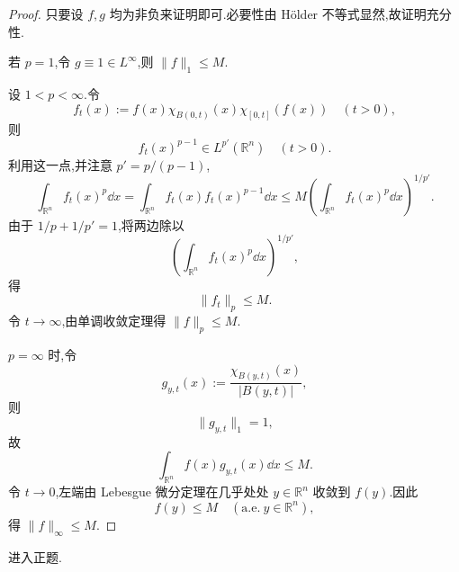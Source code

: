 \begin{proof}
只要设 $f, g$ 均为非负来证明即可.必要性由 Hölder 不等式显然,故证明充分性.

若 $p = 1$,令 $g \equiv 1 \in L^{\infty}$,则 $\|f\|_{1} \leq M$.

设 $1 < p < \infty$.令
\begin{equation*}
f_{t}(x) := f(x)\chi_{B(0,t)}(x)\chi_{[0,t]}(f(x)) \quad (t > 0),
\end{equation*}
则
\begin{equation*}
f_{t}(x)^{p-1} \in L^{p'}(\mathbb{R}^{n}) \quad (t > 0).
\end{equation*}
利用这一点,并注意 $p' = p/(p-1)$,
\begin{equation*}
\int_{\mathbb{R}^{n}}f_{t}(x)^{p}\dd x = \int_{\mathbb{R}^{n}}f_{t}(x)f_{t}(x)^{p-1}\dd x \leq M\left(\int_{\mathbb{R}^{n}}f_{t}(x)^{p}\dd x\right)^{1/p'}.
\end{equation*}
由于 $1/p + 1/p' = 1$,将两边除以
\begin{equation*}
\left(\int_{\mathbb{R}^{n}}f_{t}(x)^{p}\dd x\right)^{1/p'},
\end{equation*}
得
\begin{equation*}
\|f_{t}\|_{p} \leq M.
\end{equation*}
令 $t \to \infty$,由单调收敛定理得 $\|f\|_{p} \leq M$.

$p = \infty$ 时,令
\begin{equation*}
g_{y,t}(x) := \frac{\chi_{B(y,t)}(x)}{|B(y,t)|},
\end{equation*}
则
\begin{equation*}
\|g_{y,t}\|_{1} = 1,
\end{equation*}
故
\begin{equation*}
\int_{\mathbb{R}^{n}}f(x)g_{y,t}(x)\dd x \leq M.
\end{equation*}
令 $t \to 0$,左端由 Lebesgue 微分定理在几乎处处 $y \in \mathbb{R}^{n}$ 收敛到 $f(y)$.因此
\begin{equation*}
f(y) \leq M \quad (\mathrm{a.e.} \ y \in \mathbb{R}^{n}),
\end{equation*}
得 $\|f\|_{\infty} \leq M$.
\end{proof}

进入正题.

